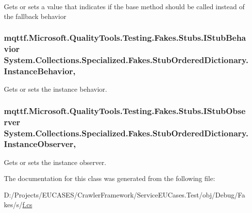 Gets or sets a value that indicates if the base method should be called instead of the fallback behavior

\hypertarget{class_system_1_1_collections_1_1_specialized_1_1_fakes_1_1_stub_ordered_dictionary_ab141c26ae2aa170136866ce1698c419e}{
\subsubsection[{Instance\-Behavior}]{\setlength{\rightskip}{0pt plus 5cm}mqttf.\-Microsoft.\-Quality\-Tools.\-Testing.\-Fakes.\-Stubs.\-I\-Stub\-Behavior System.\-Collections.\-Specialized.\-Fakes.\-Stub\-Ordered\-Dictionary.\-Instance\-Behavior\hspace{0.3cm}{\ttfamily [get]}, {\ttfamily [set]}}}\label{class_system_1_1_collections_1_1_specialized_1_1_fakes_1_1_stub_ordered_dictionary_ab141c26ae2aa170136866ce1698c419e}


Gets or sets the instance behavior.

\hypertarget{class_system_1_1_collections_1_1_specialized_1_1_fakes_1_1_stub_ordered_dictionary_abc41206655285be6df1c80f9c648d188}{
\subsubsection[{Instance\-Observer}]{\setlength{\rightskip}{0pt plus 5cm}mqttf.\-Microsoft.\-Quality\-Tools.\-Testing.\-Fakes.\-Stubs.\-I\-Stub\-Observer System.\-Collections.\-Specialized.\-Fakes.\-Stub\-Ordered\-Dictionary.\-Instance\-Observer\hspace{0.3cm}{\ttfamily [get]}, {\ttfamily [set]}}}\label{class_system_1_1_collections_1_1_specialized_1_1_fakes_1_1_stub_ordered_dictionary_abc41206655285be6df1c80f9c648d188}


Gets or sets the instance observer.



The documentation for this class was generated from the following file\-:\begin{DoxyCompactItemize}
\item 
D\-:/\-Projects/\-E\-U\-C\-A\-S\-E\-S/\-Crawler\-Framework/\-Service\-E\-U\-Cases.\-Test/obj/\-Debug/\-Fakes/s/\hyperlink{s_2f_8cs}{f.\-cs}\end{DoxyCompactItemize}
